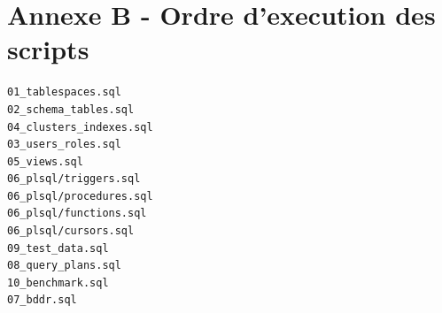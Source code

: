 \documentclass[11pt,a4paper]{article}
\begin{document}
\section{Annexe B - Ordre d'execution des scripts}

\begin{Verbatim}[fontsize=\small, frame=single]
01_tablespaces.sql
02_schema_tables.sql
04_clusters_indexes.sql
03_users_roles.sql
05_views.sql
06_plsql/triggers.sql
06_plsql/procedures.sql
06_plsql/functions.sql
06_plsql/cursors.sql
09_test_data.sql
08_query_plans.sql
10_benchmark.sql
07_bddr.sql
\end{Verbatim}
\end{document}
